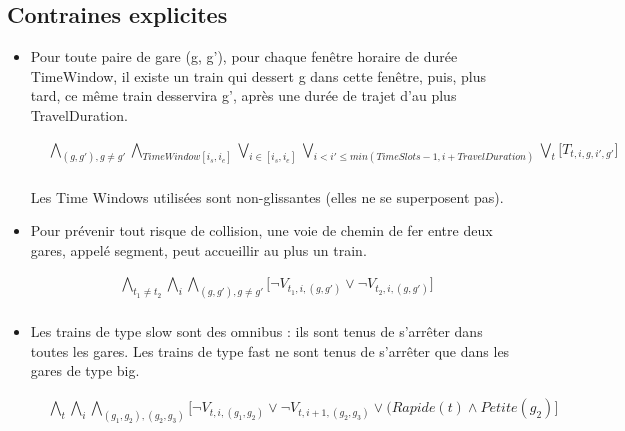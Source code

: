 \documentclass[a4paper]{article}
\begin{document}
\subsection{Contraines explicites}
\begin{itemize}


\item{Pour toute paire de gare (g, g'), pour chaque fenêtre horaire de durée TimeWindow,
il existe un train qui dessert g dans cette fenêtre, puis, plus tard, ce même train
desservira g', après une durée de trajet d’au plus TravelDuration.}

    \begin{equation*}
    \begin{split}
      & 
      \bigwedge_{(g,g'), g \neq g'} 
      \bigwedge_{TimeWindow [i_s,i_e]}
      \bigvee_{i \in [i_s,i_e]}
      \bigvee_{i < i' \leq min(TimeSlots - 1, i + TravelDuration)}
      \bigvee_{t}
      \big[T_{t,i,g,i', g'}] \\
    \end{split}
    \end{equation*}

Les Time Windows utilisées sont non-glissantes (elles ne se superposent pas).
    
    

\item{Pour prévenir tout risque de collision, une voie de chemin de fer entre deux gares,
appelé segment, peut accueillir au plus un train.}

    \begin{equation*}
    \begin{split}
      & \bigwedge_{t_1 \neq t_2}
      \bigwedge_{i}
      \bigwedge_{(g,g'), g \neq g'} \big[
      \neg V_{t_1,i,(g,g')} \lor \neg V_{t_2,i,(g,g')} \big] \\
    \end{split}
    \end{equation*}

\item{Les trains de type slow sont des omnibus : ils sont tenus de s’arrêter dans toutes les
gares. Les trains de type fast ne sont tenus de s’arrêter que dans les gares de type big.}

    \begin{equation*}
    \begin{split}
      & \bigwedge_{t}
      \bigwedge_{i}
      \bigwedge_{(g_1,g_2), (g_2, g_3)}  \big[
      \neg V_{t,i,(g_1,g_2)} \lor \neg V_{t,i+1,(g_2,g_3)} \lor (Rapide(t) \land Petite(g_2) \big] \\
    \end{split}
    \end{equation*}


\end{itemize}
\end{document}
